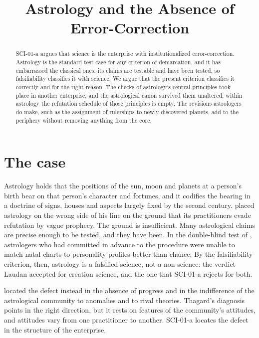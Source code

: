 \documentclass{situationist-preprint}
\title{Astrology and the Absence of Error-Correction}
\begin{document}
\maketitle

\begin{abstract}
SCI-01-a argues that science is the enterprise with institutionalized error-correction. Astrology is the standard test case for any criterion of demarcation, and it has embarrassed the classical ones: its claims are testable and have been tested, so falsifiability classifies it with science. We argue that the present criterion classifies it correctly and for the right reason. The checks of astrology's central principles took place in another enterprise, and the astrological canon survived them unaltered; within astrology the refutation schedule of those principles is empty. The revisions astrologers do make, such as the assignment of rulerships to newly discovered planets, add to the periphery without removing anything from the core.
\end{abstract}

\section{The case}\label{s:case}

Astrology holds that the positions of the sun, moon and planets at a person's birth bear on that person's character and fortunes, and it codifies the bearing in a doctrine of signs, houses and aspects largely fixed by the second century. \citet{Popper1963} placed astrology on the wrong side of his line on the ground that its practitioners evade refutation by vague prophecy. The ground is insufficient. Many astrological claims are precise enough to be tested, and they have been. In the double-blind test of \citet{Carlson1985}, astrologers who had committed in advance to the procedure were unable to match natal charts to personality profiles better than chance. By the falsifiability criterion, then, astrology is a falsified science, not a non-science: the verdict Laudan accepted for creation science, and the one that SCI-01-a rejects for both.

\citet{Thagard1978} located the defect instead in the absence of progress and in the indifference of the astrological community to anomalies and to rival theories. Thagard's diagnosis points in the right direction, but it rests on features of the community's attitudes, and attitudes vary from one practitioner to another. SCI-01-a locates the defect in the structure of the enterprise.
\end{document}

